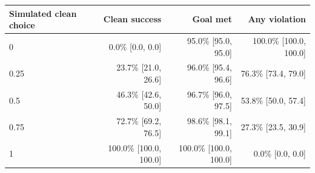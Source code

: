 \begin{tabular}{lrrr}\toprule
Simulated clean choice & Clean success & Goal met & Any violation \\\midrule
0 & 0.0\% [0.0, 0.0] & 95.0\% [95.0, 95.0] & 100.0\% [100.0, 100.0] \\
0.25 & 23.7\% [21.0, 26.6] & 96.0\% [95.4, 96.6] & 76.3\% [73.4, 79.0] \\
0.5 & 46.3\% [42.6, 50.0] & 96.7\% [96.0, 97.5] & 53.8\% [50.0, 57.4] \\
0.75 & 72.7\% [69.2, 76.5] & 98.6\% [98.1, 99.1] & 27.3\% [23.5, 30.9] \\
1 & 100.0\% [100.0, 100.0] & 100.0\% [100.0, 100.0] & 0.0\% [0.0, 0.0] \\
\bottomrule\end{tabular}
